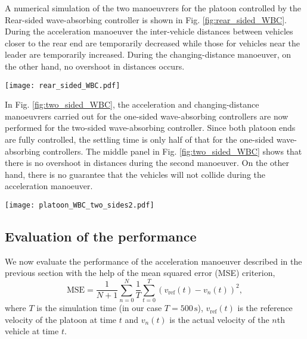 \documentclass[final,5p,times,twocolumn]{elsarticle}
\begin{document}
A numerical simulation of the two manoeuvrers for the platoon controlled by the Rear-sided wave-absorbing controller is shown in Fig. \ref{fig:rear_sided_WBC}. During the acceleration manoeuver the inter-vehicle distances between vehicles closer to the rear end are temporarily decreased while those for vehicles near the leader are temporarily increased. During the changing-distance manoeuver, on the other hand, no overshoot in distances occurs.
\begin{figure*}[!htbp]
 \centering
  \texttt{[image: rear\_sided\_WBC.pdf]}
    \caption{As in Fig. \ref{fig:accel_of_platoon_WBC} but with the Rear-sided wave-absorbing controller.}
  \label{fig:rear_sided_WBC}
\end{figure*}

In Fig. \ref{fig:two_sided_WBC}, the acceleration and changing-distance manoeuvrers carried out for the one-sided wave-absorbing controllers are now performed for the two-sided wave-absorbing controller. Since both platoon ends are fully controlled, the settling time is only half of that for the one-sided wave-absorbing controllers. The middle panel in Fig. \ref{fig:two_sided_WBC} shows that there is no overshoot in distances during the second manoeuver. On the other hand, there is no guarantee that the vehicles will not collide during the acceleration manoeuver.

\begin{figure*}[!htbp]
 \centering
  \texttt{[image: platoon\_WBC\_two\_sides2.pdf]}
    \caption{As in Fig. \ref{fig:accel_of_platoon_WBC} but with the Two-sided wave-absorbing controller. The second command to increase $d_{\text{ref}}$ comes at $t = 100\,{\text{s}}$.}
  \label{fig:two_sided_WBC}
\end{figure*}

\subsection{Evaluation of the performance}
We now evaluate the performance of the acceleration manoeuver described in the previous section with the help of the mean squared error (MSE) criterion,
\begin{equation}
  \text{MSE} = \frac{1}{N+1} \sum_{n=0}^{N} \frac{1}{T}\sum_{t=0}^{T} (v_{\text{ref}}(t) -v_n(t))^2,
  \label{eq:MSE}
\end{equation}
where $T$ is the simulation time (in our case $T=500\,\text{s}$), $v_{\text{ref}}(t)$ is the reference velocity of the platoon at time $t$ and $v_n(t)$ is the actual velocity of the $n$th vehicle at time $t$.
\end{document}
